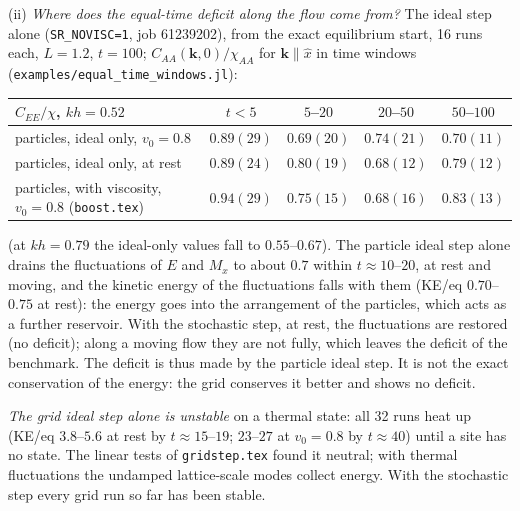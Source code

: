 \documentclass[11pt,aps,preprint,nofootinbib,superscriptaddress,tightenlines]{revtex4-2}
\begin{document}
(ii) \emph{Where does the equal-time deficit along the flow come from?}  The ideal step alone (\texttt{SR\_NOVISC=1}, job
61239202), from the exact equilibrium start, 16 runs each, $L=1.2$, $t=100$; $C_{AA}(\bm k,0)/\chi_{AA}$ for $\bm k\parallel\hat x$ in time
windows (\texttt{examples/equal\_time\_windows.jl}):
\begin{center}
\begin{tabular}{lcccc}
\hline
$C_{EE}/\chi$, $kh=0.52$ & $t<5$ & $5$--$20$ & $20$--$50$ & $50$--$100$ \\ \hline
particles, ideal only, $v_0=0.8$ & $0.89(29)$ & $0.69(20)$ & $0.74(21)$ & $0.70(11)$ \\
particles, ideal only, at rest & $0.89(24)$ & $0.80(19)$ & $0.68(12)$ & $0.79(12)$ \\
particles, with viscosity, $v_0=0.8$ (\texttt{boost.tex}) & $0.94(29)$ & $0.75(15)$ & $0.68(16)$ & $0.83(13)$ \\
\hline
\end{tabular}
\end{center}
(at $kh=0.79$ the ideal-only values fall to $0.55$--$0.67$).  The particle ideal step alone drains the fluctuations of
$E$ and $M_x$ to about $0.7$ within $t\approx10$--$20$, at rest and moving, and the kinetic energy of the fluctuations
falls with them (KE/eq $0.70$--$0.75$ at rest): the energy goes into the arrangement of the particles, which acts
as a further reservoir.  With the stochastic step, at rest, the fluctuations are restored (no deficit); along a
moving flow they are not fully, which leaves the deficit of the benchmark.  The deficit is thus made by the
particle ideal step.  It is not the exact conservation of the energy: the grid conserves it better and shows no
deficit.

\emph{The grid ideal step alone is unstable} on a thermal state: all 32 runs heat up (KE/eq $3.8$--$5.6$ at rest by
$t\approx15$--$19$; $23$--$27$ at $v_0=0.8$ by $t\approx40$) until a site has no state.  The linear tests of \texttt{gridstep.tex} found it
neutral; with thermal fluctuations the undamped lattice-scale modes collect energy.  With the stochastic step
every grid run so far has been stable.
\end{document}
